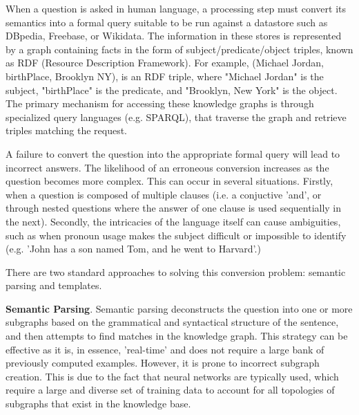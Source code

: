 \documentclass[sigplan,screen]{acmart}
\begin{document}
When a question is asked in human language, a processing step must convert its semantics into a formal query suitable to be run against a datastore such as DBpedia, Freebase, or Wikidata. The information in these stores is represented by a graph containing facts in the form of subject/predicate/object triples, known as RDF (Resource Description Framework). For example, (Michael Jordan, birthPlace, Brooklyn NY), is an RDF triple, where "Michael Jordan" is the subject, "birthPlace" is the predicate, and "Brooklyn, New York" is the object. The primary mechanism for accessing these knowledge graphs is through specialized query languages (e.g. SPARQL), that traverse the graph and retrieve triples matching the request.

A failure to convert the question into the appropriate formal query will lead to incorrect answers. The likelihood of an erroneous conversion increases as the question becomes more complex. This can occur in several situations. Firstly, when a question is composed of multiple clauses (i.e. a conjuctive 'and', or through nested questions where the answer of one clause is used sequentially in the next). Secondly, the intricacies of the language itself can cause ambiguities, such as when pronoun usage makes the subject difficult or impossible to identify (e.g. 'John has a son named Tom, and he went to Harvard'.)

There are two standard approaches to solving this conversion problem: semantic parsing and templates.

\textbf{Semantic Parsing}. Semantic parsing deconstructs the question into one or more subgraphs based on the grammatical and syntactical structure of the sentence, and then attempts to find matches in the knowledge graph. This strategy can be effective as it is, in essence, 'real-time' and does not require a large bank of previously computed examples. However, it is prone to incorrect subgraph creation. This is due to the fact that neural networks are typically used, which require a large and diverse set of training data to account for all topologies of subgraphs that exist in the knowledge base.
\end{document}
